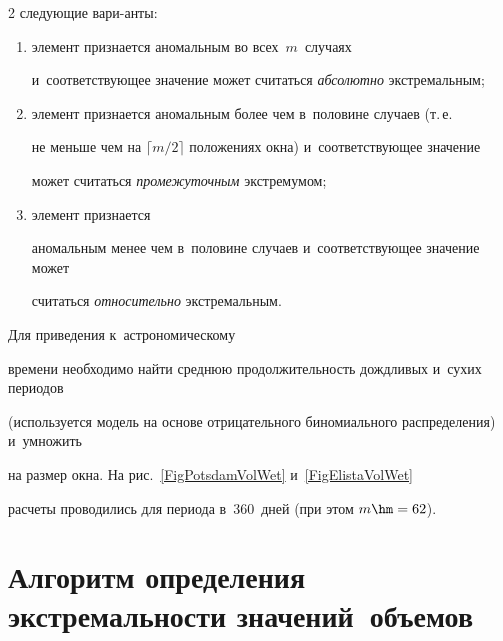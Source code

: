 \begin{multicols}{2}
сле\-ду\-ющие вари-\linebreak анты:\\[-15pt]


\begin{enumerate}[(1)]


\item элемент признается аномальным во всех~$m$~случаях 


и~соответствующее значение может считаться \textit{абсолютно} экстремальным;


\item 


элемент признается аномальным более чем в~половине случаев (т.\,е.\ 


не меньше чем на $\lceil  m/2\rceil$ положениях окна)  и~соответствующее значение 


может считаться \textit{промежуточным} экстремумом; 


\item элемент признается 


аномальным менее чем в~половине случаев и~соответствующее значение может 


считаться \textit{относительно} экстремальным.


\end{enumerate}





 Для приведения к~астрономическому 


времени необходимо найти среднюю продолжительность дождливых и~сухих периодов 


(используется модель на основе отрицательного биномиального распределения) и~умножить 


на размер окна. На рис.~\ref{FigPotsdamVolWet} и~\ref{FigElistaVolWet} 


расчеты проводились для периода в~360~дней (при этом $m\hm=62$).





\vspace*{-6pt}





\section{Алгоритм определения экстремальности значений~объемов}






\end{multicols}
